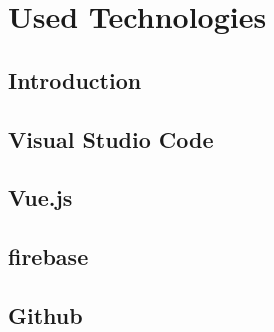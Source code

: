 \chapter{Used Technologies} %
\label{chap:used_technologies}

\section{Introduction}


\section{Visual Studio Code}

\section{Vue.js}

\section{firebase}

\section{Github} %
    


